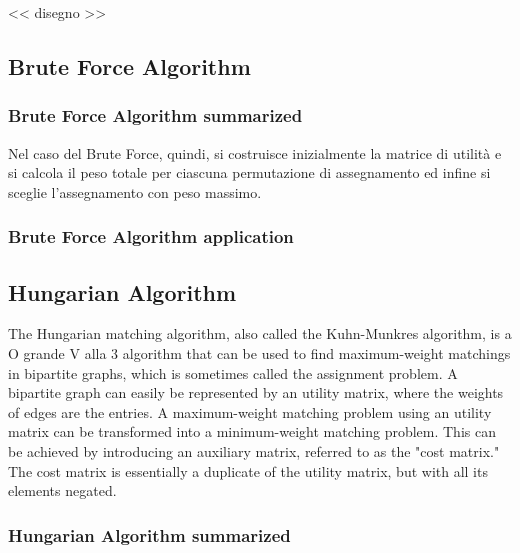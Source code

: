 << disegno >>

\subsection{Brute Force Algorithm}
\subsubsection{Brute Force Algorithm summarized}

Nel caso del Brute Force, quindi, si costruisce inizialmente la matrice di utilità e si calcola il peso totale per ciascuna permutazione di assegnamento ed infine si sceglie l'assegnamento con peso massimo.
\\

\subsubsection{Brute Force Algorithm application}

\subsection{Hungarian Algorithm}

The Hungarian matching algorithm, also called the Kuhn-Munkres algorithm, is a O grande V alla 3 algorithm that can be used to find maximum-weight matchings in bipartite graphs, which is sometimes called the assignment problem. A bipartite graph can easily be represented by an utility matrix, where the weights of edges are the entries. 
A maximum-weight matching problem using an utility matrix can be transformed into a minimum-weight matching problem.
This can be achieved by introducing an auxiliary matrix, referred to as the "cost matrix."
The cost matrix is essentially a duplicate of the utility matrix, but with all its elements negated.
\\

\subsubsection{Hungarian Algorithm summarized}

